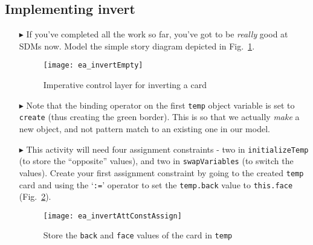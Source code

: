 \newpage
\hypertarget{invertCard vis}{}
\subsection{Implementing invert}
\visHeader

\begin{itemize}

\vspace{0.5cm}

\item[$\blacktriangleright$] If you've completed all the work so far, you've got to be \emph{really} good at SDMs now. Model the simple story diagram
depicted in Fig.~\ref{fig:sdm_invertEmpty}.

\vspace{0.5cm}

\begin{figure}[htbp]
\begin{center}
  \texttt{[image: ea\_invertEmpty]}
  \caption{Imperative control layer for inverting a card}  
  \label{fig:sdm_invertEmpty}
\end{center}
\end{figure}

\item[$\blacktriangleright$] Note that the binding operator on the first \texttt{temp} object variable is set to \texttt{create} (thus creating the green
border). This is so that we actually \emph{make} a new object, and not pattern match to an existing one in our model.

\item[$\blacktriangleright$] This activity will need four assignment constraints - two in \texttt{in\-it\-ia\-lize\-Temp} (to store the ``opposite'' values),
and two in \texttt{swapVariables} (to switch the values). Create your first assignment constraint by going to the created \texttt{temp} card and using the
`\texttt{:=}' operator to set the \texttt{temp.back} value to \texttt{this.face} (Fig.~\ref{fig:sdm_invertAssignment}).

\begin{figure}[htbp]
\begin{center}
  \texttt{[image: ea\_invertAttConstAssign]}
  \caption{Store the \texttt{back} and \texttt{face} values of the card in \texttt{temp}}  
  \label{fig:sdm_invertAssignment}
\end{center}
\end{figure}

\clearpage


\end{itemize}

